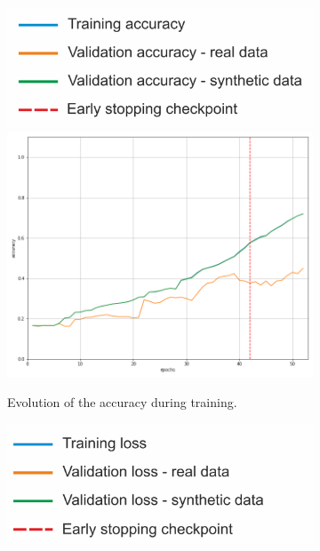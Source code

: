 \begin{figure}[!h]
\centering
    \begin{subfigure}[t]{.45\textwidth}
        \centering
        \includegraphics[width=.7\textwidth]{images/popisAc.png}
        \includegraphics[width=\textwidth]{images/accuracy1ss_0.png}
        \caption{Evolution of the accuracy during training.}
        \label{fig:acc1}
    \end{subfigure}
    \begin{subfigure}[t]{.45\textwidth}
        \centering
        \includegraphics[width=.7\textwidth]{images/popisLoss.png}

\end{subfigure}
\end{figure}
